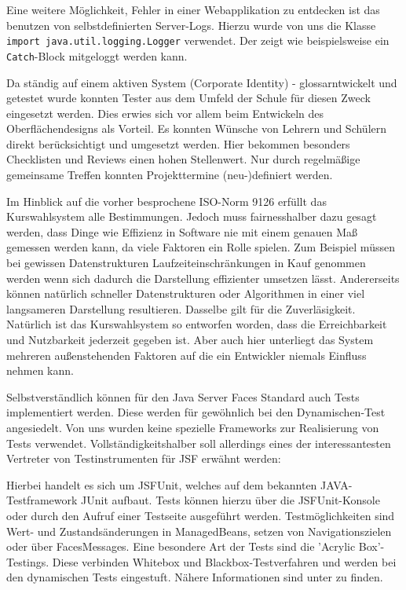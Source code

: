 \documentclass[12pt, twoside, a4paper, ngerman]{article}
\begin{document}
Eine weitere Möglichkeit, Fehler in einer Webapplikation zu entdecken ist das benutzen von selbstdefinierten Server-Logs.
Hierzu wurde von uns die Klasse \texttt{import java.util.logging.Logger} verwendet. Der  zeigt wie beispielsweise ein \texttt{Catch}-Block  mitgeloggt werden kann.

	

Da ständig auf einem aktiven System (Corporate Identity) - glossarntwickelt und getestet wurde konnten Tester aus dem Umfeld der Schule für diesen Zweck eingesetzt werden.
Dies erwies sich vor allem beim Entwickeln des Oberflächendesigns als Vorteil. Es konnten Wünsche von Lehrern und Schülern direkt berücksichtigt und umgesetzt werden.
Hier bekommen besonders Checklisten und Reviews einen hohen Stellenwert. Nur durch regelmäßige gemeinsame Treffen konnten Projekttermine (neu-)definiert werden.

Im Hinblick auf die vorher besprochene ISO-Norm 9126 erfüllt das Kurswahlsystem alle Bestimmungen. Jedoch muss fairnesshalber dazu gesagt werden, dass Dinge wie Effizienz in Software nie mit einem genauen Maß gemessen werden kann, da viele Faktoren ein Rolle spielen.
Zum Beispiel müssen bei gewissen Datenstrukturen Laufzeiteinschränkungen in Kauf genommen werden wenn sich dadurch die Darstellung effizienter umsetzen lässt. Andererseits können natürlich schneller Datenstrukturen oder Algorithmen in einer viel langsameren Darstellung resultieren.
Dasselbe gilt für die Zuverläsigkeit. Natürlich ist das Kurswahlsystem so entworfen worden, dass die Erreichbarkeit und Nutzbarkeit jederzeit gegeben ist. Aber auch hier unterliegt das System mehreren außenstehenden Faktoren auf die ein Entwickler niemals Einfluss nehmen kann.

Selbstverständlich können für den Java Server Faces Standard auch Tests implementiert werden. Diese werden für gewöhnlich bei den Dynamischen-Test angesiedelt. Von uns wurden keine spezielle Frameworks zur Realisierung von Tests verwendet. Vollständigkeitshalber soll allerdings eines der interessantesten Vertreter von Testinstrumenten für JSF erwähnt werden:

Hierbei handelt es sich um \gls{JSFUnit}, welches auf dem bekannten JAVA-Testframework \gls{JUnit} aufbaut. Tests können hierzu über die JSFUnit-Konsole oder durch den Aufruf einer Testseite ausgeführt werden. Testmöglichkeiten sind Wert- und Zustandsänderungen in ManagedBeans, setzen von Navigationszielen oder über FacesMessages.
Eine besondere Art der Tests sind die 'Acrylic Box'-Testings. Diese verbinden Whitebox und Blackbox-Testverfahren und werden bei den dynamischen Tests eingestuft.
Nähere Informationen sind unter \cite{JSFUnit01} zu finden.
\end{document}
